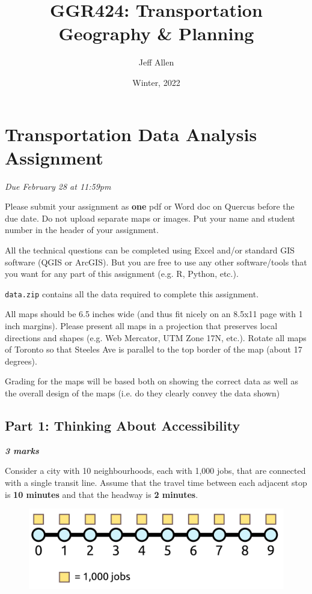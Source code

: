 \documentclass[11pt]{article}
\title{\textbf{GGR424: Transportation Geography \& Planning}}
\author{Jeff Allen}
\date{Winter, 2022}
\begin{document}
	\allsectionsfont{\sffamily}
	
	\section*{Transportation Data Analysis Assignment} 
		
	\textit{Due February 28 at 11:59pm}
	
	Please submit your assignment as \textbf{one} pdf or Word doc on Quercus before the due date. Do not upload separate maps or images. Put your name and student number in the header of your assignment.
	
	All the technical questions can be completed using Excel and/or standard GIS software (QGIS or ArcGIS). But you are free to use any other software/tools that you want for any part of this assignment (e.g. R, Python, etc.).
	
	\texttt{data.zip} contains all the data required to complete this assignment.
	
	All maps should be 6.5 inches wide (and thus fit nicely on an 8.5x11 page with 1 inch margins). Please present all maps in a projection that preserves local directions and shapes (e.g. Web Mercator, UTM Zone 17N, etc.). Rotate all maps of Toronto so that Steeles Ave is parallel to the top border of the map (about 17 degrees).
	
	Grading for the maps will be based both on showing the correct data as well as the overall design of the maps (i.e. do they clearly convey the data shown)
	
			
			
	
	
	
	\subsection*{Part 1: Thinking About Accessibility} 
	
	\vspace{-2mm}
	\textbf{\textit{3 marks}}
	
	Consider a city with 10 neighbourhoods, each with 1,000 jobs, that are connected with a single transit line. Assume that the travel time between each adjacent stop is \textbf{10 minutes} and that the headway is \textbf{2 minutes}. 
	
	\begin{figure}[h]
		\centering
		\includegraphics[width=0.5\linewidth]{images/city_plain.png}
	\end{figure}
\end{document}
